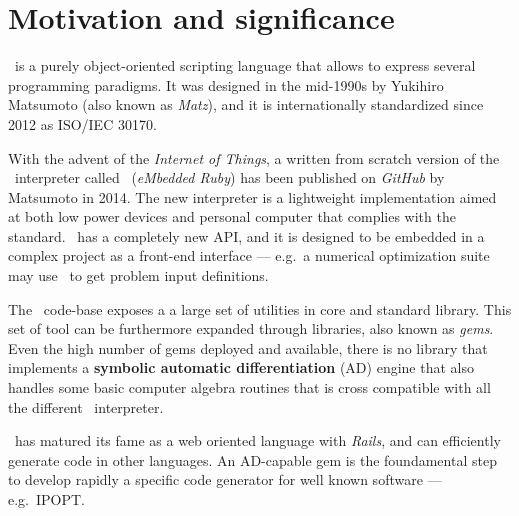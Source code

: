 \section{Motivation and significance}
\label{sec:motivation}

\Ruby~is a purely object-oriented scripting language that allows to express several programming paradigms. It was designed in the mid-1990s by Yukihiro Matsumoto (also known as \emph{Matz}), and it is internationally standardized since 2012 as ISO/IEC 30170.

With the advent of the \emph{Internet of Things}, a written from scratch version of the \Ruby~interpreter called \Mruby~(\emph{eMbedded Ruby}) has been published on \emph{GitHub} by Matsumoto in 2014. The new interpreter is a lightweight implementation aimed at both low power devices and personal computer that complies with the standard. \Mruby~has a completely new API, and it is designed to be embedded in a complex project as a front-end interface --- e.g.\ a numerical optimization suite may use \Mruby~to get problem input definitions.

The \Ruby~code-base exposes a a large set of utilities in core and standard library. This set of tool can be furthermore expanded through libraries, also known as \emph{gems}. Even the high number of gems deployed and available, there is no library that implements a \textbf{symbolic automatic differentiation} (AD) engine that also handles some basic computer algebra routines that is cross compatible with all the different \Ruby~interpreter.

\Ruby~has matured its fame as a web oriented language with \emph{Rails}, and can efficiently generate code in other languages. An AD-capable gem is the foundamental step to develop rapidly a specific code generator for well known software --- e.g.\ IPOPT\@.

